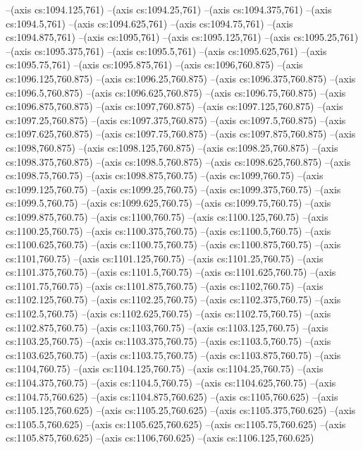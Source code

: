 --(axis cs:1094.125,761)
--(axis cs:1094.25,761)
--(axis cs:1094.375,761)
--(axis cs:1094.5,761)
--(axis cs:1094.625,761)
--(axis cs:1094.75,761)
--(axis cs:1094.875,761)
--(axis cs:1095,761)
--(axis cs:1095.125,761)
--(axis cs:1095.25,761)
--(axis cs:1095.375,761)
--(axis cs:1095.5,761)
--(axis cs:1095.625,761)
--(axis cs:1095.75,761)
--(axis cs:1095.875,761)
--(axis cs:1096,760.875)
--(axis cs:1096.125,760.875)
--(axis cs:1096.25,760.875)
--(axis cs:1096.375,760.875)
--(axis cs:1096.5,760.875)
--(axis cs:1096.625,760.875)
--(axis cs:1096.75,760.875)
--(axis cs:1096.875,760.875)
--(axis cs:1097,760.875)
--(axis cs:1097.125,760.875)
--(axis cs:1097.25,760.875)
--(axis cs:1097.375,760.875)
--(axis cs:1097.5,760.875)
--(axis cs:1097.625,760.875)
--(axis cs:1097.75,760.875)
--(axis cs:1097.875,760.875)
--(axis cs:1098,760.875)
--(axis cs:1098.125,760.875)
--(axis cs:1098.25,760.875)
--(axis cs:1098.375,760.875)
--(axis cs:1098.5,760.875)
--(axis cs:1098.625,760.875)
--(axis cs:1098.75,760.75)
--(axis cs:1098.875,760.75)
--(axis cs:1099,760.75)
--(axis cs:1099.125,760.75)
--(axis cs:1099.25,760.75)
--(axis cs:1099.375,760.75)
--(axis cs:1099.5,760.75)
--(axis cs:1099.625,760.75)
--(axis cs:1099.75,760.75)
--(axis cs:1099.875,760.75)
--(axis cs:1100,760.75)
--(axis cs:1100.125,760.75)
--(axis cs:1100.25,760.75)
--(axis cs:1100.375,760.75)
--(axis cs:1100.5,760.75)
--(axis cs:1100.625,760.75)
--(axis cs:1100.75,760.75)
--(axis cs:1100.875,760.75)
--(axis cs:1101,760.75)
--(axis cs:1101.125,760.75)
--(axis cs:1101.25,760.75)
--(axis cs:1101.375,760.75)
--(axis cs:1101.5,760.75)
--(axis cs:1101.625,760.75)
--(axis cs:1101.75,760.75)
--(axis cs:1101.875,760.75)
--(axis cs:1102,760.75)
--(axis cs:1102.125,760.75)
--(axis cs:1102.25,760.75)
--(axis cs:1102.375,760.75)
--(axis cs:1102.5,760.75)
--(axis cs:1102.625,760.75)
--(axis cs:1102.75,760.75)
--(axis cs:1102.875,760.75)
--(axis cs:1103,760.75)
--(axis cs:1103.125,760.75)
--(axis cs:1103.25,760.75)
--(axis cs:1103.375,760.75)
--(axis cs:1103.5,760.75)
--(axis cs:1103.625,760.75)
--(axis cs:1103.75,760.75)
--(axis cs:1103.875,760.75)
--(axis cs:1104,760.75)
--(axis cs:1104.125,760.75)
--(axis cs:1104.25,760.75)
--(axis cs:1104.375,760.75)
--(axis cs:1104.5,760.75)
--(axis cs:1104.625,760.75)
--(axis cs:1104.75,760.625)
--(axis cs:1104.875,760.625)
--(axis cs:1105,760.625)
--(axis cs:1105.125,760.625)
--(axis cs:1105.25,760.625)
--(axis cs:1105.375,760.625)
--(axis cs:1105.5,760.625)
--(axis cs:1105.625,760.625)
--(axis cs:1105.75,760.625)
--(axis cs:1105.875,760.625)
--(axis cs:1106,760.625)
--(axis cs:1106.125,760.625)
